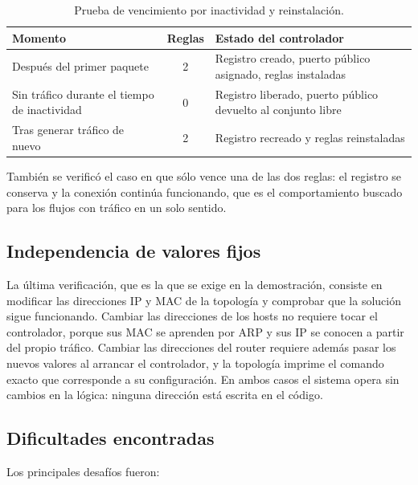 ﻿\documentclass[10pt,a4paper]{article}
\begin{document}
\begin{table}[H]
\centering
\small
\begin{tabular}{p{}cp{}}
\toprule
\textbf{Momento} & \textbf{Reglas} & \textbf{Estado del controlador} \\
\midrule
Después del primer paquete & 2 & Registro creado, puerto público asignado, reglas
instaladas \\
Sin tráfico durante el tiempo de inactividad & 0 & Registro liberado, puerto público
devuelto al conjunto libre \\
Tras generar tráfico de nuevo & 2 & Registro recreado y reglas reinstaladas \\
\bottomrule
\end{tabular}
\caption{Prueba de vencimiento por inactividad y reinstalación.}
\label{tab:vencimiento}
\end{table}

También se verificó el caso en que sólo vence una de las dos reglas: el registro se
conserva y la conexión continúa funcionando, que es el comportamiento buscado para
los flujos con tráfico en un solo sentido.

\subsection{Independencia de valores fijos}

La última verificación, que es la que se exige en la demostración, consiste en
modificar las direcciones IP y MAC de la topología y comprobar que la solución sigue
funcionando. Cambiar las direcciones de los hosts no requiere tocar el controlador,
porque sus MAC se aprenden por ARP y sus IP se conocen a partir del propio tráfico.
Cambiar las direcciones del router requiere además pasar los nuevos valores al
arrancar el controlador, y la topología imprime el comando exacto que corresponde a
su configuración. En ambos casos el sistema opera sin cambios en la lógica: ninguna
dirección está escrita en el código.

\subsection{Dificultades encontradas}

Los principales desafíos fueron:
\end{document}
